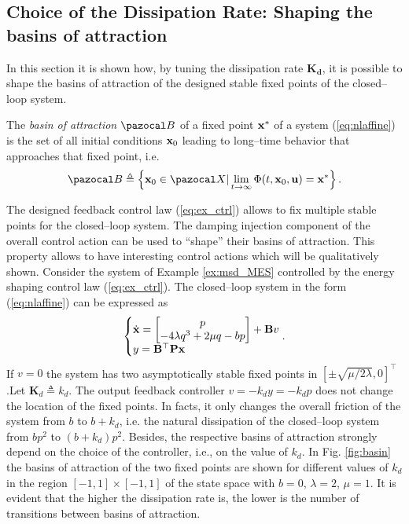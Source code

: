 \subsection{Choice of the Dissipation Rate: Shaping the basins of attraction}
%
In this section it is shown how, by tuning the dissipation rate $\mathbf{K_d}$, it is possible to shape the basins of attraction of the designed stable fixed points of the closed--loop system.
%
\begin{defn}
The \textit{basin of attraction} $\B$ of a fixed point $\mathbf{x}^*$ of a system (\ref{eq:nlaffine}) is the set of all initial conditions $\mathbf{x}_0$ leading to long--time behavior that approaches that fixed point, i.e.
%
\begin{equation*}
    \B \triangleq \left\{\xb_0\in\X|\lim \limits_{t\rightarrow\infty}\Phi(t,\xb_0,\ub)=\xb^*\right\}.
\end{equation*}
%
\end{defn}
%
The designed feedback control law (\ref{eq:ex_ctrl}) allows to fix multiple stable points for the closed--loop system. The damping injection component of the overall control action can be used to ``shape'' their basins of attraction. This property allows to have interesting control actions which will be qualitatively shown.
%
Consider the system of Example \ref{ex:msd_MES} controlled by the energy shaping control law (\ref{eq:ex_ctrl}). The closed--loop system in the form (\ref{eq:nlaffine}) can be expressed as
%
\begin{equation*}
	\left\{
    \begin{matrix*}[l]
    \dot{\xb} = \begin{bmatrix}p\\-4\lambda q^3+2\mu q-bp\end{bmatrix} + \Bb v\\
    y = \Bb^\top \Pb\xb
    \end{matrix*}
    \right. .
\end{equation*}
%
If $v= 0$ the system has two asymptotically stable fixed points in $[\pm\sqrt{\mu/2\lambda},0]^\top$.Let $\mathbf{K}_d \triangleq k_d$. The output feedback controller $v = -k_d y = -k_dp$ does not change the location of the fixed points. In facts, it only changes the overall friction of the system from $b$ to $b+k_d$, i.e. the natural dissipation of the closed--loop system from $bp^2$ to $(b+k_d)p^2$.
%
Besides, the respective basins of attraction strongly depend on the choice of the controller, i.e., on the value of $k_d$. In Fig. \ref{fig:basin} the basins of attraction of the two fixed points are shown for different values of $k_d$ in the region $[-1,1]\times [-1,1]$ of the state space with $b = 0$, $\lambda = 2$, $\mu = 1$. It is evident that the higher the dissipation rate is, the lower is the number of transitions between basins of attraction.
